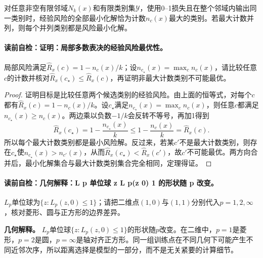 \label{struct:V2-C02-CH12}
\begin{theorem}[局部多数表决的经验风险最优性]\label{thm:V2-C02-vote}
对任意非空有限邻域$N_k(x)$和有限类别集$\mathcal Y$，使用0--1损失且在整个邻域内输出同一类别时，经验风险的全部最小化解恰为计数$n_c(x)$最大的类别。若最大计数并列，则每个并列类别都是风险最小化解。
\end{theorem}

\label{struct:V2-C02-CH13}
\paragraph{读前自检：证明：局部多数表决的经验风险最优性。}局部风险满足$\widehat R_x(c)=1-n_c(x)/k$；设$n_{c_\star}(x)=\max_c n_c(x)$，请比较任意$c$的计数并核对$\widehat R_x(c_\star)\le\widehat R_x(c)$，再证明非最大计数类别不可能最优。\par

\begin{proof}
证明目标是比较任意两个候选类别的经验风险。由上面的恒等式，对每个$c$都有$\widehat R_x(c)=1-n_c(x)/k$。设$c_\star$满足$n_{c_\star}(x)=\max_c n_c(x)$，则任意$c$都满足$n_{c_\star}(x)\ge n_c(x)$。两边乘以负数$-1/k$会反转不等号，再加1得到
\[
\widehat R_x(c_\star)=1-\frac{n_{c_\star}(x)}k
\le1-\frac{n_c(x)}k=\widehat R_x(c).
\]
所以每个最大计数类别都是最小风险解。反过来，若某$c'$不是最大计数类别，则存在$c_\star$使$n_{c_\star}(x)>n_{c'}(x)$，从而$\widehat R_x(c_\star)<\widehat R_x(c')$，故$c'$不可能最优。两方向合并后，最小化解集合与最大计数类别集合完全相同，定理得证。
\end{proof}

\label{struct:V2-C02-CH14}
\paragraph{读前自检：几何解释：L p 单位球 z L p(z 0) 1 的形状随 p 改变。}$L_p$单位球为$\{z:L_p(z,0)\le1\}$；请把二维点$(1,0)$与$(1,1)$分别代入$p=1,2,\infty$，核对菱形、圆与正方形的边界差异。\par

\begin{geometrybox}
\textbf{几何解释。}
$L_p$单位球$\{z:L_p(z,0)\le1\}$的形状随$p$改变。在二维中，$p=1$是菱形，$p=2$是圆，$p=\infty$是轴对齐正方形。同一组训练点在不同几何下可能产生不同近邻次序，所以距离选择是模型的一部分，而不是无关紧要的计算细节。
\end{geometrybox}

